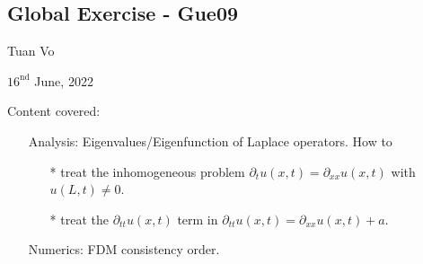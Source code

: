 \documentclass[12pt]{article}
\begin{document}
\begin{center}
	\section*{Global Exercise - Gue09}
\end{center}
\begin{center}
	Tuan Vo
\end{center}
\begin{center}
	$16^{\text{nd}}$ June, 2022
\end{center}
Content covered:
\begin{itemize}
	\item[\checkmark] Analysis: Eigenvalues/Eigenfunction of Laplace operators. How to
	      \begin{itemize}
		      \item[*] treat the inhomogeneous problem $\partial_{t}u(x,t) = \partial_{xx}u(x,t)$ with $u(L,t) \neq 0$.
		      \item[*] treat the $\partial_{tt} u(x,t)$ term in $\partial_{tt} u(x,t) =   \partial_{xx}u(x,t) + a$.
	      \end{itemize}
	\item[\checkmark] Numerics: FDM consistency order.
\end{itemize}
\end{document}
